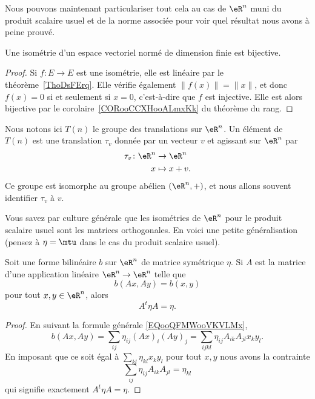 Nous pouvons maintenant particulariser tout cela au cas de \( \eR^n\) muni du produit scalaire usuel et de la norme associée pour voir quel résultat nous avons à peine prouvé.

\begin{lemma}        \label{LEMooJPYZooHETCqt}
	Une isométrie d'un espace vectoriel normé de dimension finie est bijective.
\end{lemma}

\begin{proof}
	Si \( f\colon E\to E\) est une isométrie, elle est linéaire par le théorème~\ref{ThoDsFErq}. Elle vérifie également \( \| f(x) \|=\| x \|\), et donc \( f(x)=0\) si et seulement si \( x=0\), c'est-à-dire que \( f\) est injective. Elle est alors bijective par le corolaire~\ref{CORooCCXHooALmxKk} du théorème du rang.
\end{proof}

Nous notons ici \( T(n)\) le groupe des translations sur \( \eR^n\). Un élément de \( T(n)\) est une translation \( \tau_v\) donnée par un vecteur \( v\) et agissant sur \( \eR^n\) par
\begin{equation}
	\begin{aligned}
		\tau_v\colon \eR^n & \to \eR^{n}  \\
		x                  & \mapsto x+v.
	\end{aligned}
\end{equation}
Ce groupe est isomorphe au groupe abélien \( (\eR^n,+)\), et nous allons souvent identifier \( \tau_v\) à \( v\).

Vous savez par culture générale que les isométries de \( \eR^n\) pour le produit scalaire usuel sont les matrices orthogonales. En voici une petite généralisation (pensez à \( \eta=\mtu\) dans le cas du produit scalaire usuel).
\begin{proposition}     \label{PROPooSYQMooEnZFdp}
	Soit une forme bilinéaire \( b\) sur \( \eR^n\) de matrice symétrique \( \eta\). Si \( A\) est la matrice d'une application linéaire \( \eR^n\to \eR^n\) telle que
	\begin{equation}
		b(Ax,Ay)=b(x,y)
	\end{equation}
	pour tout \( x,y\in\eR^n\), alors
	\begin{equation}
		A^t\eta A=\eta.
	\end{equation}
\end{proposition}

\begin{proof}
	En suivant la formule générale \eqref{EQooQFMWooVKVLMx},
	\begin{equation}
		b(Ax,Ay)=\sum_{ij} \eta_{ij} (Ax)_i(Ay)_j=\sum_{ijkl}\eta_{ij}A_{ik}A_{jl}x_ky_l.
	\end{equation}
	En imposant que ce soit égal à \( \sum_{kl}\eta_{kl}x_ky_l\) pour tout \( x,y\) nous avons la contrainte
	\begin{equation}
		\sum_{ij}\eta_{ij}A_{ik}A_{jl}=\eta_{kl}
	\end{equation}
	qui signifie exactement \( A^t\eta A=\eta\).
\end{proof}

